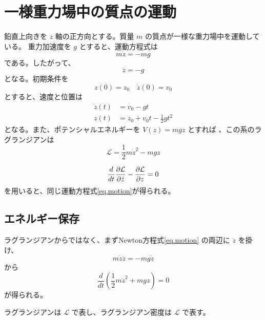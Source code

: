 \documentclass[a4paper,11pt]{ltjsarticle}
\begin{document}
\section{一様重力場中の質点の運動}
鉛直上向きを $z$ 軸の正方向とする。質量 $m$ の質点が一様な重力場中を運動している。
重力加速度を $g$ とすると、運動方程式は
\begin{equation}
m\ddot{z}=-mg
\label{eq.motion}
\end{equation}
である。したがって、
\[
\ddot{z}=-g
\]
となる。初期条件を
\[
z(0)=z_{0} \quad \dot{z}(0)=v_{0}
\]
とすると、速度と位置は
\begin{align*}
\dot{z}(t)&=v_{0}-gt\\
z(t)&=z_{0}+v_{0}t-\frac{1}{2}gt^2
\end{align*}
となる。また、ポテンシャルエネルギーを $V(z)=mgz$ とすれば
、この系のラグランジアンは
\begin{equation}
\mathcal{L}=\frac{1}{2}m\dot{z}^2-mgz
\end{equation}

\begin{equation}
\frac{d}{dt}\pdv{\mathcal{L}}{\dot{z}}-\pdv{\mathcal{L}}{z}=0
\label{eq.Euler-Lagrange}
\end{equation}
を用いると、同じ運動方程式\eqref{eq.motion}が得られる。

\subsection{エネルギー保存}
ラグランジアンからではなく、まずNewton方程式\eqref{eq.motion}
の両辺に $\dot{z}$ を掛け、
\[
m\dot{z}\ddot{z}=-mg\dot{z}
\]
から
\begin{equation}
\frac{d}{dt}\left(\frac{1}{2}m\dot{z}^2+mgz\right)=0
\end{equation}
が得られる。

ラグランジアンは $\mathcal{L}$ で表し、ラグランジアン密度は $\mathscr{L}$ で表す。
\end{document}
